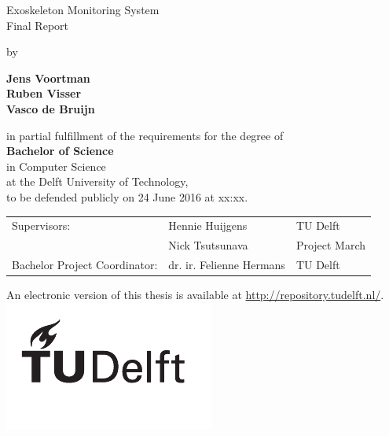 \begin{titlepage}
\begin{center}

{\makeatletter
\Huge Exoskeleton Monitoring System
\makeatother}\\[0.2cm]

{\makeatletter
\LARGE Final Report
\makeatother}

\bigskip
\bigskip

by

\bigskip
\bigskip

{\makeatletter \bfseries
Jens Voortman\\
Ruben Visser\\
Vasco de Bruijn
\makeatother}

\vfill

in partial fulfillment of the requirements for the degree of\\
\bigskip
{\bfseries Bachelor of Science}\\
in Computer Science\\
\bigskip
at the Delft University of Technology,\\
to be defended publicly on 24 June 2016 at xx:xx.



\vfill

\begin{tabular}{l l l}
    Supervisors: & Hennie Huijgens & TU Delft \\
    & Nick Tsutsunava & Project March \\
    Bachelor Project Coordinator: & dr. ir. Felienne Hermans & TU Delft\\
 \end{tabular}

\bigskip
\bigskip

\bigskip
\bigskip

An electronic version of this thesis is available at \url{http://repository.tudelft.nl/}.\\[0.5cm]
\includegraphics{logo/logo_black}
\end{center}
\end{titlepage}